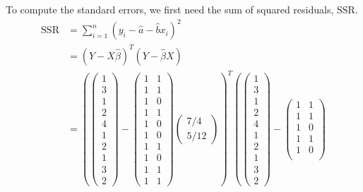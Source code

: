 \documentclass[12pt,twoside]{article}
\begin{document}
\begin{problems}
\begin{problemparts}
To compute the standard errors, we first need the sum of squared residuals, 
$\mathrm{SSR}$.
\begin{align*}
    \mathrm{SSR} &= \sum_{i = 1}^n (y_i - \hat{a} - \hat{b} x_i)^2 \\
    &= \left(Y - X \hat{\beta}\right)^T \left(Y - \hat{\beta} X\right) \\
    &= \left(\begin{pmatrix}
    1 \\
    3 \\
    1 \\
    2 \\
    4 \\
    1 \\
    2 \\
    1 \\
    3 \\
    2 \end{pmatrix} - \begin{pmatrix}
    1 & 1 \\
    1 & 1 \\
    1 & 0 \\
    1 & 1 \\
    1 & 0 \\
    1 & 0 \\
    1 & 1 \\
    1 & 0 \\
    1 & 1 \\
    1 & 1 \end{pmatrix} \begin{pmatrix}
    7/4 \\
    5/12 \end{pmatrix}\right)^T \left(\begin{pmatrix}
    1 \\
    3 \\
    1 \\
    2 \\
    4 \\
    1 \\
    2 \\
    1 \\
    3 \\
    2 \end{pmatrix} - \begin{pmatrix}
    1 & 1 \\
    1 & 1 \\
    1 & 0 \\
    1 & 1 \\
    1 & 0 \\

\end{pmatrix}
\end{align*}
\end{problemparts}
\end{problems}
\end{document}
